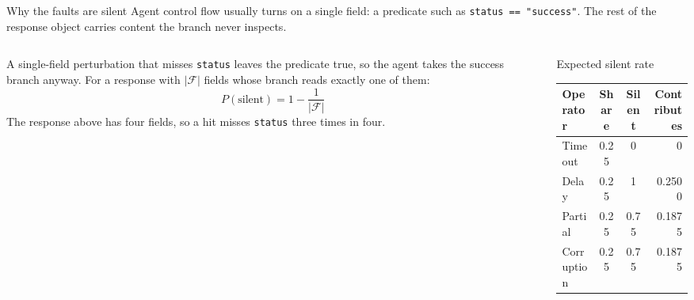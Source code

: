 \documentclass[aspectratio=169,10pt]{beamer}
\newcommand{\cmt}[1]{{\color{stone}\small #1}}          %
\begin{document}
\begin{frame}{Why the faults are silent}
  Agent control flow usually turns on a single field: a predicate such as
  \texttt{status == "success"}. The rest of the response object carries content the branch
  never inspects.
  \vfill
  \begin{center}
  \end{center}
  \vfill
  \begin{columns}[T]
    \begin{column}{0.44\textwidth}
      A single-field perturbation that misses \texttt{status} leaves the predicate true, so the
      agent takes the success branch anyway. For a response with $|\mathcal{F}|$ fields whose
      branch reads exactly one of them:
      \[ P(\text{silent}) = 1 - \frac{1}{|\mathcal{F}|} \]
      The response above has four fields, so a hit misses \texttt{status} three times in four.
    \end{column}
    \begin{column}{0.52\textwidth}
      \vspace*{-1.1em}
      \begin{block}{Expected silent rate}
        \centering
        {\footnotesize
        \begin{tabular}{@{}lccr@{}}
          \toprule
          \textbf{Operator} & \textbf{Share} & \textbf{Silent} & \textbf{Contributes}\\
          \midrule
          Timeout    & 0.25 & 0    & 0\\
          Delay      & 0.25 & 1    & 0.2500\\
          Partial    & 0.25 & 0.75 & 0.1875\\
          Corruption & 0.25 & 0.75 & 0.1875\\

\end{tabular}}
\end{block}
\end{column}
\end{columns}
\end{frame}
\end{document}
